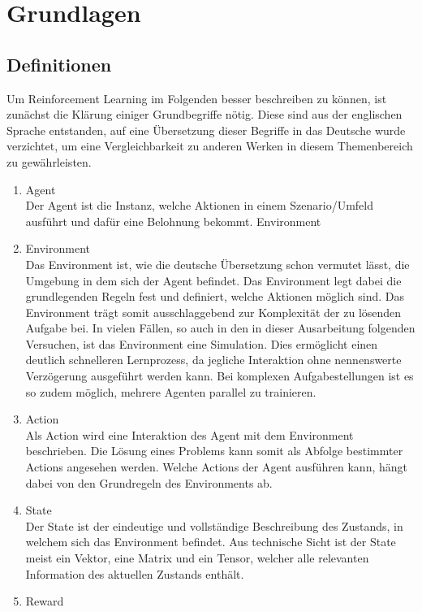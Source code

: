 \section{Grundlagen}


\subsection{Definitionen}
Um Reinforcement Learning im Folgenden besser beschreiben zu können, ist zunächst die Klärung einiger Grundbegriffe nötig. Diese sind aus der englischen Sprache entstanden, auf eine Übersetzung dieser Begriffe in das Deutsche wurde verzichtet, um eine Vergleichbarkeit zu anderen Werken in diesem Themenbereich zu gewährleisten.

\begin{enumerate}
    \item Agent\\
    Der Agent ist die Instanz, welche Aktionen in einem Szenario/Umfeld ausführt und dafür eine Belohnung bekommt.
    Environment
    \item Environment\\
    Das Environment ist, wie die deutsche Übersetzung schon vermutet lässt, die Umgebung in dem sich der Agent befindet. Das Environment legt dabei die grundlegenden Regeln fest und definiert, welche Aktionen möglich sind. Das Environment trägt somit ausschlaggebend zur Komplexität der zu lösenden Aufgabe bei. In vielen Fällen, so auch in den in dieser Ausarbeitung folgenden Versuchen, ist das Environment eine Simulation. Dies ermöglicht einen deutlich schnelleren Lernprozess, da jegliche Interaktion ohne nennenswerte Verzögerung ausgeführt werden kann. Bei komplexen Aufgabestellungen ist es so zudem möglich, mehrere Agenten parallel zu trainieren.
    \item Action\\
    Als Action wird eine Interaktion des Agent mit dem Environment beschrieben. Die Lösung eines Problems kann somit als Abfolge bestimmter Actions angesehen werden. Welche Actions der Agent ausführen kann, hängt dabei von den Grundregeln des Environments ab.
    \item State\\
    Der State ist der eindeutige und vollständige Beschreibung des Zustands, in welchem sich das Environment befindet. Aus technische Sicht ist der State meist ein Vektor, eine Matrix und ein Tensor, welcher alle relevanten Information des aktuellen Zustands enthält.
    \item Reward\\

\end{enumerate}
